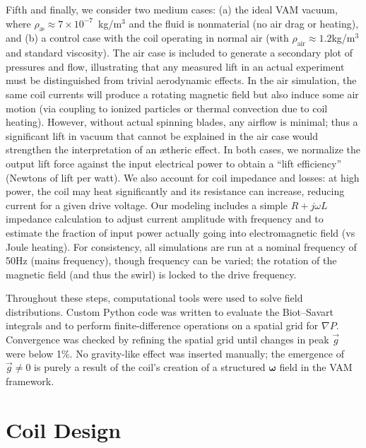 \documentclass[twocolumn,aps,pre,floatfix,nofootinbib]{revtex4-2}
\begin{document}
Fifth and finally, we consider two medium cases: (a) the ideal VAM vacuum, where $\rho_{\text{æ}}\approx7\times10^{-7}$~kg/m$^3$ and the fluid is nonmaterial (no air drag or heating), and (b) a control case with the coil operating in normal air (with $\rho_{\text{air}}\approx1.2$kg/m$^3$ and standard viscosity). The air case is included to generate a secondary plot of pressures and flow, illustrating that any measured lift in an actual experiment must be distinguished from trivial aerodynamic effects. In the air simulation, the same coil currents will produce a rotating magnetic field but also induce some air motion (via coupling to ionized particles or thermal convection due to coil heating). However, without actual spinning blades, any airflow is minimal; thus a significant lift in vacuum that cannot be explained in the air case would strengthen the interpretation of an ætheric effect. In both cases, we normalize the output lift force against the input electrical power to obtain a “lift efficiency” (Newtons of lift per watt). We also account for coil impedance and losses: at high power, the coil may heat significantly and its resistance can increase, reducing current for a given drive voltage. Our modeling includes a simple $R + j\omega L$ impedance calculation to adjust current amplitude with frequency and to estimate the fraction of input power actually going into electromagnetic field (vs Joule heating). For consistency, all simulations are run at a nominal frequency of 50Hz (mains frequency), though frequency can be varied; the rotation of the magnetic field (and thus the swirl) is locked to the drive frequency.


Throughout these steps, computational tools were used to solve field distributions. Custom Python code was written to evaluate the Biot–Savart integrals and to perform finite-difference operations on a spatial grid for $\nabla P$. Convergence was checked by refining the spatial grid until changes in peak $\vec{g}$ were below 1\%. No gravity-like effect was inserted manually; the emergence of $\vec{g}\neq 0$ is purely a result of the coil’s creation of a structured $\boldsymbol{\omega}$ field in the VAM framework.


\section{Coil Design}
\end{document}
